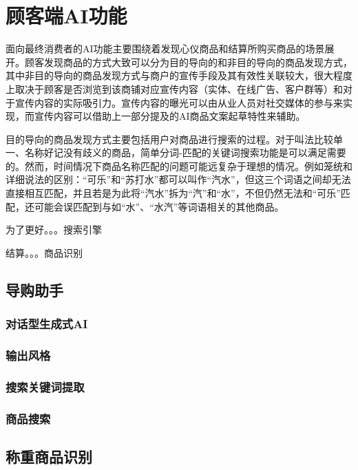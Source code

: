 \newpage
\section{顾客端AI功能}
\label{sec:guest_features}

面向最终消费者的AI功能主要围绕着发现心仪商品和结算所购买商品的场景展开。顾客发现商品的方式大致可以分为目的导向的和非目的导向的商品发现方式，其中非目的导向的商品发现方式与商户的宣传手段及其有效性关联较大，很大程度上取决于顾客是否浏览到该商铺对应宣传内容（实体、在线广告、客户群等）和对于宣传内容的实际吸引力。宣传内容的曝光可以由从业人员对社交媒体的参与来实现，而宣传内容可以借助上一部分提及的AI商品文案起草特性来辅助。

目的导向的商品发现方式主要包括用户对商品进行搜索的过程。对于叫法比较单一、名称好记没有歧义的商品，简单分词-匹配的关键词搜索功能是可以满足需要的。然而，时间情况下商品名称匹配的问题可能远复杂于理想的情况。例如笼统和详细说法的区别：“可乐”和“苏打水”都可以叫作“汽水”，但这三个词语之间却无法直接相互匹配，并且若是为此将“汽水”拆为“汽”和“水”，不但仍然无法和“可乐”匹配，还可能会误匹配到与如“水”、“水汽”等词语相关的其他商品。

为了更好。。。搜索引擎

结算。。。商品识别

\subsection{导购助手}

\subsubsection{对话型生成式AI}

\subsubsection{输出风格}

\subsubsection{搜索关键词提取}

\subsubsection{商品搜索}

\subsection{称重商品识别}

